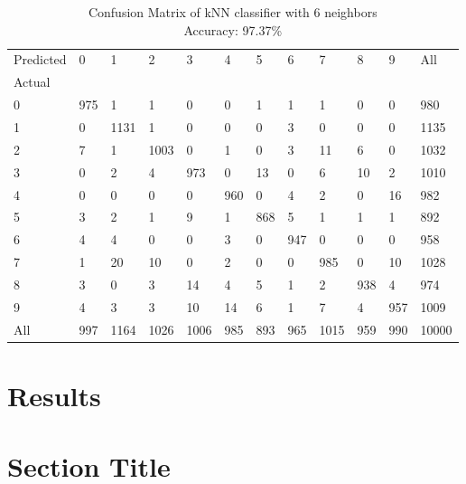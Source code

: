 \begin{table}[H]
    \centering
    \begin{tabular}{llllllllllll}
        Predicted & 0 & 1     & 2     & 3     & 4    & 5    & 6    & 7     & 8    & 9    & All \\
        Actual &      &       &       &       &      &      &      &       &      &      &        \\
        0      &  975 &     1 &     1 &     0 &    0 &    1 &    1 &     1 &    0 &    0 &    980 \\
        1      &    0 &  1131 &     1 &     0 &    0 &    0 &    3 &     0 &    0 &    0 &   1135 \\
        2      &    7 &     1 &  1003 &     0 &    1 &    0 &    3 &    11 &    6 &    0 &   1032 \\
        3      &    0 &     2 &     4 &   973 &    0 &   13 &    0 &     6 &   10 &    2 &   1010 \\
        4      &    0 &     0 &     0 &     0 &  960 &    0 &    4 &     2 &    0 &   16 &    982 \\
        5      &    3 &     2 &     1 &     9 &    1 &  868 &    5 &     1 &    1 &    1 &    892 \\
        6      &    4 &     4 &     0 &     0 &    3 &    0 &  947 &     0 &    0 &    0 &    958 \\
        7      &    1 &    20 &    10 &     0 &    2 &    0 &    0 &   985 &    0 &   10 &   1028 \\
        8      &    3 &     0 &     3 &    14 &    4 &    5 &    1 &     2 &  938 &    4 &    974 \\
        9      &    4 &     3 &     3 &    10 &   14 &    6 &    1 &     7 &    4 &  957 &   1009 \\
        All    &  997 &  1164 &  1026 &  1006 &  985 &  893 &  965 &  1015 &  959 &  990 &  10000 \\
    \end{tabular}
    \caption*{Confusion Matrix of kNN classifier with 6 neighbors\\
    Accuracy: 97.37\%}
\end{table}




\section*{Results}

\lipsum[1-3]

\section*{Section Title}
\lipsum[1-2]

